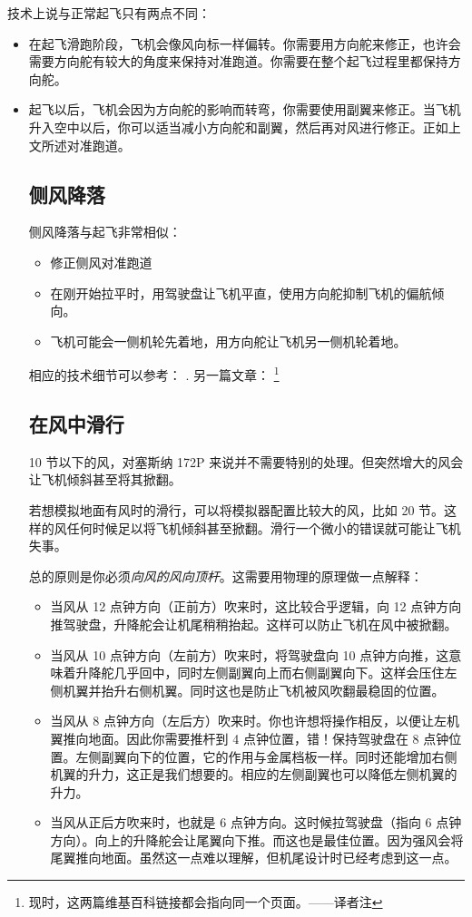 技术上说与正常起飞只有两点不同：
\begin{itemize}
    \item 在起飞滑跑阶段，飞机会像风向标一样偏转。你需要用方向舵来修正，也许会需要方向舵有较大的角度来保持对准跑道。你需要在整个起飞过程里都保持方向舵。
    \item 起飞以后，飞机会因为方向舵的影响而转弯，你需要使用副翼来修正。当飞机升入空中以后，你可以适当减小方向舵和副翼，然后再对风进行修正。正如上文所述对准跑道。

\subsection{侧风降落}
\label{sec:Lwsw}

侧风降落与起飞非常相似：

\begin{itemize}
    \item 修正侧风对准跑道
    \item 在刚开始拉平时，用驾驶盘让飞机平直，使用方向舵抑制飞机的偏航倾向。
    \item 飞机可能会一侧机轮先着地，用方向舵让飞机另一侧机轮着地。
\end{itemize}

相应的技术细节可以参考：
.
另一篇文章：
\footnote{现时，这两篇维基百科链接都会指向同一个页面。——译者注}

\subsection{在风中滑行}
\label{sec:Twsw}

10 节以下的风，对塞斯纳 172P 来说并不需要特别的处理。但突然增大的风会让飞机倾斜甚至将其掀翻。

若想模拟地面有风时的滑行，可以将模拟器配置比较大的风，比如 20 节。这样的风任何时候足以将飞机倾斜甚至掀翻。滑行一个微小的错误就可能让飞机失事。

总的原则是你必须\emph{向风的风向顶杆}。这需要用物理的原理做一点解释：

\begin{itemize}
    \item 当风从 12 点钟方向（正前方）吹来时，这比较合乎逻辑，向 12 点钟方向推驾驶盘，升降舵会让机尾稍稍抬起。这样可以防止飞机在风中被掀翻。
    \item 当风从 10 点钟方向（左前方）吹来时，将驾驶盘向 10 点钟方向推，这意味着升降舵几乎回中，同时左侧副翼向上而右侧副翼向下。这样会压住左侧机翼并抬升右侧机翼。同时这也是防止飞机被风吹翻最稳固的位置。
    \item 当风从 8 点钟方向（左后方）吹来时。你也许想将操作相反，以便让左机翼推向地面。因此你需要推杆到 4 点钟位置，错！保持驾驶盘在 8 点钟位置。左侧副翼向下的位置，它的作用与金属档板一样。同时还能增加右侧机翼的升力，这正是我们想要的。相应的左侧副翼也可以降低左侧机翼的升力。
    \item 当风从正后方吹来时，也就是 6 点钟方向。这时候拉驾驶盘（指向 6 点钟方向）。向上的升降舵会让尾翼向下推。而这也是最佳位置。因为强风会将尾翼推向地面。虽然这一点难以理解，但机尾设计时已经考虑到这一点。
\end{itemize}


\end{itemize}
